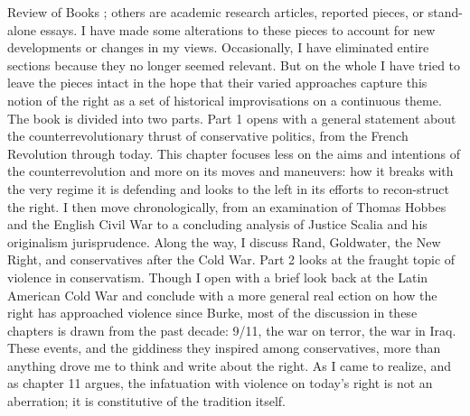 Review of Books ; others are academic research articles, reported pieces, or stand-alone essays. I have made some alterations to these pieces to account for new developments or changes in my views. Occasionally, I have eliminated entire sections because they no longer seemed relevant. But on the whole I have tried to leave the pieces intact in the hope that their varied approaches capture this notion of the right as a set of historical improvisations on a continuous theme. The book is divided into two parts. Part {\color{blue}1} opens with a general statement about the counterrevolutionary thrust of conservative politics, from the French Revolution through today. This chapter focuses less on the aims and intentions of the counterrevolution and more on its moves and maneuvers: how it breaks with the very regime it is defending and looks to the left in its efforts to recon-struct the right. I then move chronologically, from an examination of Thomas Hobbes and the English Civil War to a concluding analysis of Justice Scalia and his originalism jurisprudence. Along the way, I discuss Rand, Goldwater, the New Right, and conservatives after the Cold War. Part {\color{blue}2} looks at the fraught topic of violence in conservatism. Though I open with a brief look back at the Latin American Cold War and conclude with a more general real ection on how the right has approached violence since Burke, most of the discussion in these chapters is drawn from the past decade: 9/11, the war on terror, the war in Iraq. These events, and the giddiness they inspired among conservatives, more than anything drove me to think and write about the right. As I came to realize, and as chapter {\color{blue}11} argues, the infatuation with violence on today’s right is not an aberration; it is constitutive of the tradition itself.